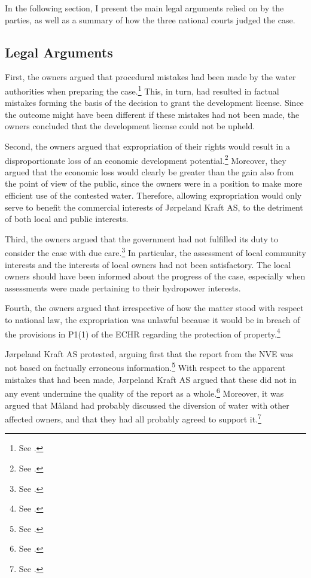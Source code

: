 In the following section, I present the main legal arguments relied on by the parties, as well as a summary of how the three national courts judged the case.

\subsection{Legal Arguments}\label{sec:5:6:2}

First, the owners argued that procedural mistakes had been made by the water authorities when preparing the case.\footnote{See \cite[12]{jorpeland09}.} This, in turn, had resulted in factual mistakes forming the basis of the decision to grant the development license. Since the outcome might have been different if these mistakes had not been made, the owners concluded that the development license could not be upheld.

Second, the owners argued that expropriation of their rights would result in a disproportionate loss of an economic development potential.\footnote{See \cite[5]{jorpeland11a}.} Moreover, they argued that the economic loss would clearly be greater than the gain also from the point of view of the public, since the owners were in a position to make more efficient use of the contested water. Therefore, allowing expropriation would only serve to benefit the commercial interests of Jørpeland Kraft AS, to the detriment of both local and public interests.

Third, the owners argued that the government had not fulfilled its duty to consider the case with due care.\footnote{See \cite[12]{jorpeland09}.} In particular, the assessment of local community interests and the interests of local owners had not been satisfactory. The local owners should have been informed about the progress of the case, especially when assessments were made pertaining to their hydropower interests.

Fourth, the owners argued that irrespective of how the matter stood with respect to national law, the expropriation was unlawful because it would be in breach of the provisions in P1(1) of the ECHR regarding the protection of property.\footnote{See \cite[07-08]{jorpeland09}.}

Jørpeland Kraft AS protested, arguing first that the report from the NVE was not based on factually erroneous information.\footnote{See \cite[16]{jorpeland11}.} With respect to the apparent mistakes that had been made, Jørpeland Kraft AS argued that these did not in any event undermine the quality of the report as a whole.\footnote{See \cite[2]{jorpeland11a}.} Moreover, it was argued that Måland had probably discussed the diversion of water with other affected owners, and that they had all probably agreed to support it.\footnote{See \cite[2]{jorpeland11a}.} 

